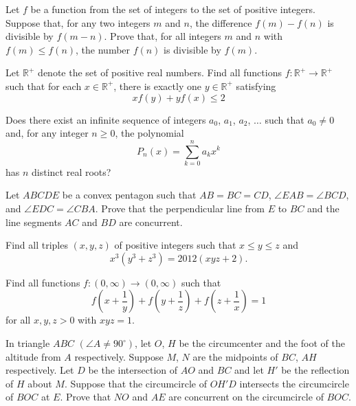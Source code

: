 \documentclass[11pt]{scrartcl}
\begin{document}
\begin{problem}[958427699872884]
Let $f$ be a function from the set of integers to the set of positive integers. Suppose that, for any two integers $m$ and $n$, the difference $f(m) - f(n)$ is divisible by $f(m- n)$. Prove that, for all integers $m$ and $n$ with $f(m) \leq f(n)$, the number $f(n)$ is divisible by $f(m)$.
\end{problem}
\begin{problem}[6558910862034852540]
Let $\mathbb{R}^+$ denote the set of positive real numbers. Find all functions $f: \mathbb{R}^+ \to \mathbb{R}^+$ such that for each $x \in \mathbb{R}^+$, there is exactly one $y \in \mathbb{R}^+$ satisfying$$xf(y)+yf(x) \leq 2$$
\end{problem}
\begin{problem}[5757441138678056478]
Does there exist an infinite sequence of integers \(a_0\), \(a_1\), \(a_2\), \(\ldots\) such that \(a_0\ne0\) and, for any integer \(n\ge0\), the polynomial\[P_n(x)=\sum_{k=0}^na_kx^k\]has \(n\) distinct real roots?
\end{problem}
\begin{problem}[6980917169184912998]
Let $ABCDE$ be a convex pentagon such that $AB=BC=CD$, $\angle{EAB}=\angle{BCD}$, and $\angle{EDC}=\angle{CBA}$. Prove that the perpendicular line from $E$ to $BC$ and the line segments $AC$ and $BD$ are concurrent.
\end{problem}
\begin{problem}[365155864249414]
Find all triples $(x,y,z)$ of positive integers such that $x \leq y \leq z$ and
\[x^3(y^3+z^3)=2012(xyz+2).\]
\end{problem}
\begin{problem}[3626448942281457521]
	Find all functions $f:(0,\infty) \rightarrow (0,\infty)$ such that\[f\left(x+\frac{1}{y}\right)+f\left(y+\frac{1}{z}\right) + f\left(z+\frac{1}{x}\right) = 1\]for all $x,y,z >0$ with $xyz =1$.
\end{problem}
\begin{problem}[2052086795458]
In triangle $ABC$ $(\angle A\neq 90^\circ)$, let $O$, $H$ be the circumcenter and the foot of the altitude from $A$ respectively. Suppose $M$, $N$ are the midpoints of $BC$, $AH$ respectively. Let $D$ be the intersection of $AO$ and $BC$ and let $H'$ be the reflection of $H$ about $M$. Suppose that the circumcircle of $OH'D$ intersects the circumcircle of $BOC$ at $E$. Prove that $NO$ and $AE$ are concurrent on the circumcircle of $BOC$.
\end{problem}
\end{document}
